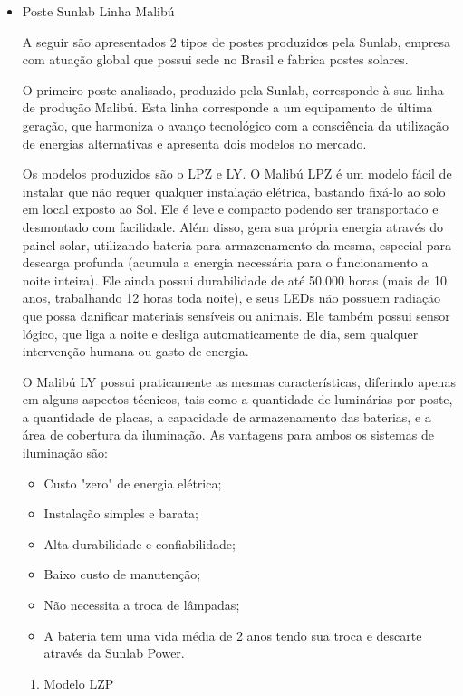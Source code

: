 \begin{itemize}
	 \item Poste Sunlab Linha Malibú
	
	A seguir são apresentados 2 tipos de postes produzidos pela Sunlab, empresa com atuação global que possui sede no Brasil e fabrica postes solares.
	
	O primeiro poste analisado, produzido pela Sunlab, corresponde à sua linha de produção Malibú. Esta linha corresponde a um equipamento de última geração, que harmoniza o avanço tecnológico com a consciência da utilização de energias alternativas e apresenta dois modelos no mercado.

	Os modelos produzidos são o LPZ e  LY. O Malibú LPZ é um modelo fácil de instalar que não requer qualquer instalação elétrica, bastando fixá-lo ao solo em local exposto ao Sol. Ele é leve e compacto podendo ser transportado e desmontado com facilidade. Além disso, gera sua própria energia através do painel solar, utilizando bateria para armazenamento da mesma, especial para descarga profunda (acumula a energia necessária para o funcionamento a noite inteira). Ele ainda possui durabilidade de até 50.000 horas (mais de 10 anos, trabalhando  12 horas toda noite), e seus LEDs não possuem radiação que possa danificar materiais sensíveis ou animais.  Ele também possui sensor lógico, que liga a noite e desliga automaticamente de dia, sem qualquer intervenção humana ou gasto de energia.

	O Malibú LY possui praticamente as mesmas características, diferindo apenas em alguns aspectos técnicos, tais como a quantidade  de luminárias por poste, a quantidade de placas, a capacidade de armazenamento das baterias, e a área de cobertura da iluminação. As vantagens para ambos os sistemas de iluminação são: 

	\begin{itemize}
		\item Custo "zero" de energia elétrica;
		\item Instalação simples e barata;
		\item Alta durabilidade e confiabilidade;
		\item Baixo custo de manutenção;
		\item Não necessita a troca de lâmpadas;
		\item A bateria tem uma vida média de 2 anos tendo sua troca e descarte através da Sunlab Power.
	\end{itemize}
	
	\begin{enumerate}
		\item Modelo LZP
		

\end{enumerate}
\end{itemize}
